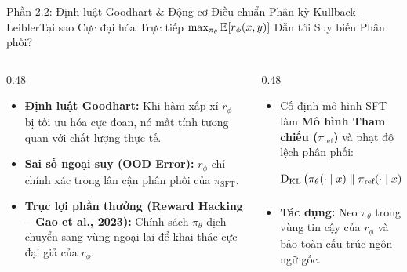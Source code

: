 \begin{frame}{Phần 2.2: Định luật Goodhart \& Động cơ Điều chuẩn Phân kỳ Kullback-Leibler}{Tại sao Cực đại hóa Trực tiếp $\max_{\pi_\theta} \operatorname{\mathbb{E}}[r_\phi(x, y)]$ Dẫn tới Suy biến Phân phối?}
  \begin{columns}[T,onlytextwidth]
    \begin{column}{0.48\textwidth}
      \footnotesize
      \begin{itemize}\setlength{\itemsep}{6pt}
        \item \textbf{Định luật Goodhart:} Khi hàm xấp xỉ $r_\phi$ bị tối ưu hóa cực đoan, nó mất tính tương quan với chất lượng thực tế.
        \item \textbf{Sai số ngoại suy (OOD Error):} $r_\phi$ chỉ chính xác trong lân cận phân phối của $\pi_{\text{SFT}}$.
        \item \textbf{Trục lợi phần thưởng (Reward Hacking -- Gao et al., 2023):} Chính sách $\pi_\theta$ dịch chuyển sang vùng ngoại lai để khai thác cực đại giả của $r_\phi$.
      \end{itemize}
    \end{column}
    \begin{column}{0.48\textwidth}
      \footnotesize
      \begin{itemize}\setlength{\itemsep}{6pt}
        \item Cố định mô hình SFT làm \textbf{Mô hình Tham chiếu ($\pi_{\text{ref}}$)} và phạt độ lệch phân phối:
          \[
            \operatorname{D_{\mathrm{KL}}}\big(\pi_\theta(\cdot \mid x) \parallel \pi_{\text{ref}}(\cdot \mid x)\big) = \operatorname{\mathbb{E}}_{y \sim \pi_\theta} \left[ \log \frac{\pi_\theta(y \mid x)}{\pi_{\text{ref}}(y \mid x)} \right]
          \]
        \item \textbf{Tác dụng:} Neo $\pi_\theta$ trong vùng tin cậy của $r_\phi$ và bảo toàn cấu trúc ngôn ngữ gốc.
      \end{itemize}
    \end{column}
  \end{columns}
\end{frame}

